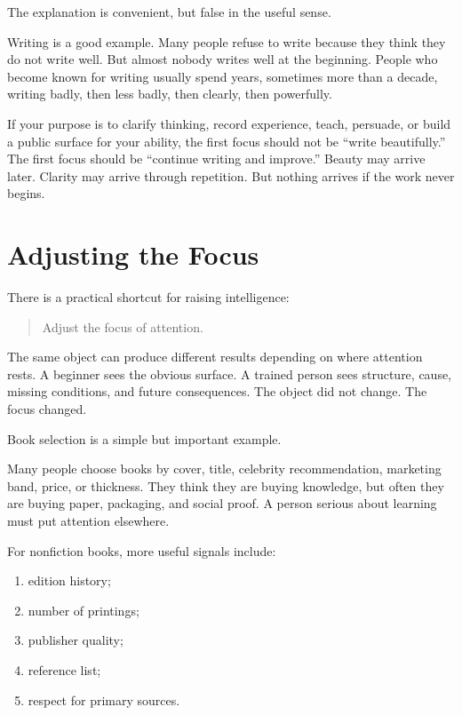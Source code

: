 The explanation is convenient, but false in the useful sense.

Writing is a good example. Many people refuse to write because they think they do not write well. But almost nobody writes well at the beginning. People who become known for writing usually spend years, sometimes more than a decade, writing badly, then less badly, then clearly, then powerfully.

If your purpose is to clarify thinking, record experience, teach, persuade, or build a public surface for your ability, the first focus should not be ``write beautifully.'' The first focus should be ``continue writing and improve.'' Beauty may arrive later. Clarity may arrive through repetition. But nothing arrives if the work never begins.

\section*{Adjusting the Focus}

There is a practical shortcut for raising intelligence:

\begin{quote}
Adjust the focus of attention.
\end{quote}

The same object can produce different results depending on where attention rests. A beginner sees the obvious surface. A trained person sees structure, cause, missing conditions, and future consequences. The object did not change. The focus changed.

Book selection is a simple but important example.

Many people choose books by cover, title, celebrity recommendation, marketing band, price, or thickness. They think they are buying knowledge, but often they are buying paper, packaging, and social proof. A person serious about learning must put attention elsewhere.

For nonfiction books, more useful signals include:

\begin{enumerate}
\item edition history;
\item number of printings;
\item publisher quality;
\item reference list;
\item respect for primary sources.
\end{enumerate}

